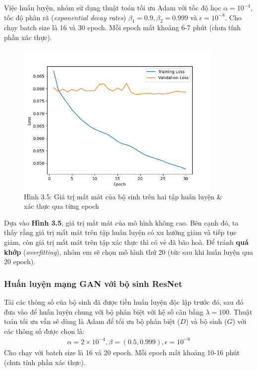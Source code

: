 \documentclass[a4paper]{article}
\begin{document}
\noindent
Việc huấn luyện, nhóm sử dụng thuật toán tối ưu Adam với tốc độ học $\alpha =  10^{-4}$, tốc độ phân rã (\textit{exponential decay rates}) $\beta_1 = 0.9, \beta_2 = 0.999$ và $\epsilon = 10^{-8}$. Cho chạy batch size là 16 và 30 epoch. Mỗi epoch mất khoảng 6-7 phút (chưa tính phần xác thực).

\begin{figure}[h!]
\centering
\includegraphics[width=10cm]{images/3_5.png}
\caption{Hình 3.5: Giá trị mất mát của bộ sinh trên hai tập huấn luyện \& xác thực qua từng epoch}
\end{figure}

\noindent
Dựa vào \textbf{Hình 3.5}, giá trị mất mát của mô hình không cao. Bên cạnh đó, ta thấy rằng giá trị mất mát trên tập huấn luyện có xu hướng giảm và tiếp tục giảm, còn giá trị mất mát trên tập xác thực thì có vẻ đã bão hoà. Để tránh \textbf{quá khớp} (\textit{overfitting}), nhóm em sẽ chọn mô hình thứ 20 (tức sau khi huấn luyện qua 20 epoch).

\subsubsection{Huấn luyện mạng GAN với bộ sinh ResNet}
Tải các thông số của bộ sinh đã được tiền huấn luyện độc lập trước đó, sau đó đưa vào để huấn luyện chung với bộ phân biệt với hệ số cân bằng $\lambda = 100$. Thuật toán tối ưu vẫn sẽ dùng là Adam để tối ưu bộ phân biệt ($D$) và bộ sinh ($G$) với các thông số được chọn là:
\begin{align*}
\alpha = 2\times 10^{-4}, \beta = (0.5, 0.999), \epsilon = 10^{-8}
\end{align*}
Cho chạy với batch size là 16 và 20 epoch. Mỗi epoch mất khoảng 10-16 phút (chưa tính phần xác thực).
\end{document}
